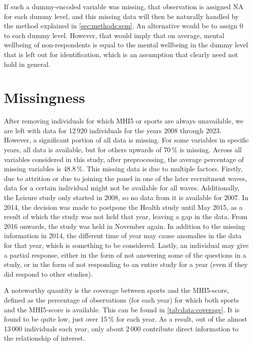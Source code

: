 If such a dummy-encoded variable was missing, that observation is assigned NA for each dummy level, and this missing
data will then be naturally handled by the method explained in \cref{sec:methods:sem}. %
An alternative would be to assign 0 to each dummy level. However, that would imply that on average, mental wellbeing of non-respondents
is equal to the mental wellbeing in the dummy level that is left out for identification, which is an assumption that
clearly need not hold in general.

\section{Missingness}
\label{sec:data:missingness}
After removing individuals for which MHI5 or sports are always unavailable, we are left with data for 12\,920 individuals
for the years 2008 through 2023.
However, a significant portion of all data is missing. For some variables in specific years, all data is available,
but for others upwards of 70\,\% is missing. Across all variables considered in this study, after preprocessing,
the average percentage of missing variables is 48.8\,\%.
This missing data is due to multiple factors. Firstly, due to attrition or due to joining the panel
in one of the later recruitment waves, data for a certain individual might not be available for all waves.
Additionally, the Leisure study only started in 2008, so no data from it is available for 2007.
In 2014, the decision was made to postpone the Health study until May 2015, as a result of which the study was not held
that year, leaving a gap in the data. From 2016 onwards, the study was held in November again.
In addition to the missing information in 2014, the different time of year may cause anomalies in the data for that year,
which is something to be considered.
Lastly, an individual may give a partial response, either in the form of not answering some of the questions in a study,
or in the form of not responding to an entire study for a year (even if they did respond to other studies).

A noteworthy quantity is the coverage between sports and the MHI5-score, defined as the percentage of observations
(for each year) for which both sports and the MHI5-score is available.
This can be found in \cref{tab:data:coverage}. It is found to be quite low, just over 15\,\% for each year. As a result,
out of the almost 13\,000 individuals each year, only about 2\,000 contribute direct information to the relationship of interest.

